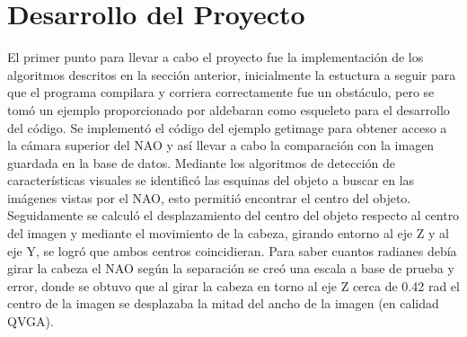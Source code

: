 \documentclass[letterpaper]{article}
\begin{document}
\section{Desarrollo del Proyecto}
El primer punto para llevar a cabo el proyecto fue la implementación de los algoritmos descritos en la sección anterior, inicialmente la estuctura a seguir para que el programa compilara y corriera correctamente fue un obstáculo, pero se tomó un ejemplo proporcionado por aldebaran como esqueleto para el desarrollo del código. Se implementó el código del ejemplo getimage para obtener acceso a la cámara superior del NAO y así llevar a cabo la comparación con la imagen guardada en la base de datos. Mediante los algoritmos de detección de características visuales se identificó las esquinas del objeto a buscar en las imágenes vistas por el NAO, esto permitió encontrar el centro del objeto. Seguidamente se calculó el desplazamiento del centro del objeto respecto al centro del imagen y mediante el movimiento de la cabeza, girando entorno al eje Z y al eje Y, se logró que ambos centros coincidieran. Para saber cuantos radianes debía girar la cabeza el NAO según la separación se creó una escala a base de prueba y error, donde se obtuvo que al girar la cabeza en torno al eje Z cerca de 0.42 rad el centro de la imagen se desplazaba la mitad del ancho de la imagen (en calidad QVGA).\\\\


\end{document}
